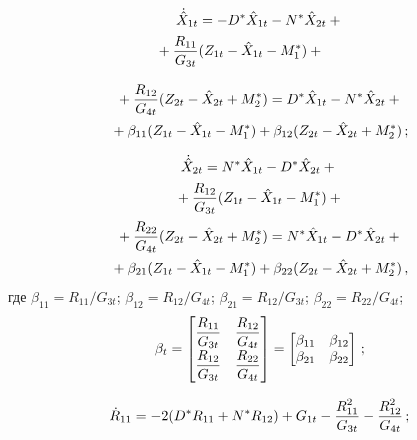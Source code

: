 \begin{multicols}{2}
\noindent
\begin{multline*}
    \dot{\hat X}_{1t} = - D^* \hat X_{1t} - N^*\hat X_{2t} +{}\\
{}+ \fr{R_{11}}{G_{3t}} (Z_{1t} -\hat X_{1t}- M_1^*)+ {}\hspace*{10mm} %
\end{multline*}

\noindent
\begin{multline*}
{}+\displaystyle\frac{\displaystyle R_{12}\mathstrut}{\displaystyle G_{4t}\mathstrut} (Z_{2t} -\hat X_{2t}+M_2^*)= D^* \hat X_{1t} - N^*\hat X_{2t} +{}\\
    {}+ \beta_{11}(Z_{1t} -\hat X_{1t}- M_1^*)+ \beta_{12} (Z_{2t} -\hat X_{2t}+M_2^*)\,;
\end{multline*}

\vspace*{-12pt}

\noindent
\begin{multline*}
    \dot{\hat X}_{2t} = N^* \hat X_{1t} - D^*\hat X_{2t} +{}\\
   {}+ \displaystyle\frac{\displaystyle R_{12}\mathstrut}{\displaystyle G_{3t}\mathstrut} (Z_{1t} -\hat X_{1t}- M_1^*)+{}\\
{}+ \displaystyle\frac{\displaystyle R_{22}\mathstrut}{\displaystyle G_{4t}\mathstrut} (Z_{2t} -\hat X_{2t}+M_2^*)=N^* \hat X_{1t} - D^*\hat X_{2t} +{}\\
    {}+ \beta_{21}(Z_{1t} -\hat X_{1t}- M_1^*)+ \beta_{22} (Z_{2t} -\hat X_{2t}+M_2^*)\,,
    \end{multline*}
где $\beta_{11}=R_{11}/G_{3t}$;  $\beta_{12}=R_{12}/G_{4t}$;
$\beta_{21}=R_{12}/G_{3t}$;  $\beta_{22}=R_{22}/G_{4t}$;
\begin{equation*}
\beta_t =
\begin{bmatrix}
    \displaystyle\frac{\displaystyle R_{11}\mathstrut}{\displaystyle G_{3t}\mathstrut}&\displaystyle\frac{\displaystyle R_{12}\mathstrut}{\displaystyle G_{4t}\mathstrut}\\
    \displaystyle\frac{\displaystyle R_{12}\mathstrut}{\displaystyle G_{3t}\mathstrut}&\displaystyle\frac{\displaystyle R_{22}\mathstrut}{\displaystyle G_{4t}\mathstrut}
    \end{bmatrix} =
\begin{bmatrix}
    \beta_{11}&\beta_{12}\\
    \beta_{21}&\beta_{22}
    \end{bmatrix}\,;
    \end{equation*}
    
    \vspace*{-12pt}
    
    \noindent
    \begin{equation*}
    \dot R_{11} =- 2(D^* R_{11} + N^* R_{12}) + G_{1t} - \displaystyle\frac{\displaystyle R_{11}^2\mathstrut}{\displaystyle G_{3t}\mathstrut} - \displaystyle\frac{\displaystyle R_{12}^2\mathstrut}{\displaystyle G_{4t}\mathstrut}\,;
    \end{equation*}
    

\end{multicols}
